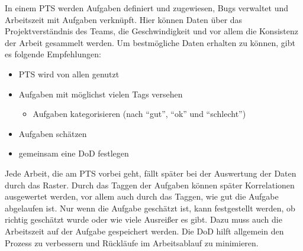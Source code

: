 In einem \ac{PTS} werden Aufgaben definiert und zugewiesen, Bugs verwaltet und Arbeitszeit mit Aufgaben verknüpft.
Hier können Daten über das Projektverständnis des Teams, die Geschwindigkeit und vor allem die Konsistenz der Arbeit gesammelt werden.
Um bestmögliche Daten erhalten zu können, gibt es folgende Empfehlungen:
\begin{itemize}[noitemsep]
  \item \ac{PTS} wird von allen genutzt
  \item Aufgaben mit möglichst vielen Tags versehen
  \begin{itemize}
    \item Aufgaben kategorisieren (nach ``gut'', ``ok'' und ``schlecht'')
  \end{itemize}
  \item Aufgaben schätzen
  \item gemeinsam eine \ac{DoD} festlegen
\end{itemize}
Jede Arbeit, die am \ac{PTS} vorbei geht, fällt später bei der Auswertung der Daten durch das Raster.
Durch das Taggen der Aufgaben können später Korrelationen ausgewertet werden, vor allem auch durch das Taggen, wie gut die Aufgabe abgelaufen ist.
Nur wenn die Aufgabe geschätzt ist, kann festgestellt werden, ob richtig geschätzt wurde oder wie viele Ausreißer es gibt. Dazu muss auch die Arbeitszeit auf der Aufgabe gespeichert werden.
Die \ac{DoD} hilft allgemein den Prozess zu verbessern und Rückläufe im Arbeitsablauf zu minimieren.

